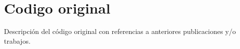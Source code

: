 
\chapter{Codigo original}
Descripción del código original con referencias a anteriores publicaciones y/o trabajos.

